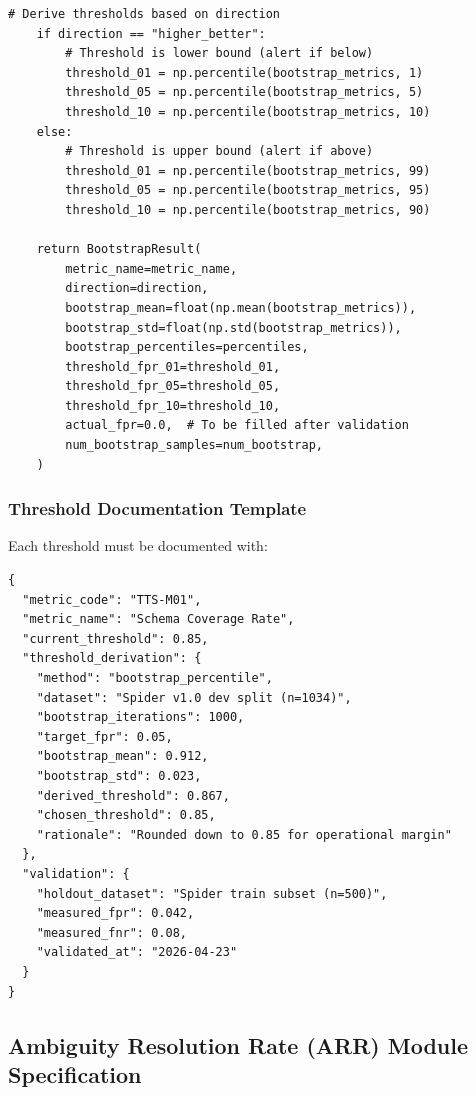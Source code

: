 \begin{lstlisting}[language=jsonx,caption={Threshold bootstrap implementation}]
    # Derive thresholds based on direction
    if direction == "higher_better":
        # Threshold is lower bound (alert if below)
        threshold_01 = np.percentile(bootstrap_metrics, 1)
        threshold_05 = np.percentile(bootstrap_metrics, 5)
        threshold_10 = np.percentile(bootstrap_metrics, 10)
    else:
        # Threshold is upper bound (alert if above)
        threshold_01 = np.percentile(bootstrap_metrics, 99)
        threshold_05 = np.percentile(bootstrap_metrics, 95)
        threshold_10 = np.percentile(bootstrap_metrics, 90)
    
    return BootstrapResult(
        metric_name=metric_name,
        direction=direction,
        bootstrap_mean=float(np.mean(bootstrap_metrics)),
        bootstrap_std=float(np.std(bootstrap_metrics)),
        bootstrap_percentiles=percentiles,
        threshold_fpr_01=threshold_01,
        threshold_fpr_05=threshold_05,
        threshold_fpr_10=threshold_10,
        actual_fpr=0.0,  # To be filled after validation
        num_bootstrap_samples=num_bootstrap,
    )
\end{lstlisting}

\subsubsection{Threshold Documentation Template}

Each threshold must be documented with:

\begin{lstlisting}[language=jsonx,caption={Threshold documentation schema}]
{
  "metric_code": "TTS-M01",
  "metric_name": "Schema Coverage Rate",
  "current_threshold": 0.85,
  "threshold_derivation": {
    "method": "bootstrap_percentile",
    "dataset": "Spider v1.0 dev split (n=1034)",
    "bootstrap_iterations": 1000,
    "target_fpr": 0.05,
    "bootstrap_mean": 0.912,
    "bootstrap_std": 0.023,
    "derived_threshold": 0.867,
    "chosen_threshold": 0.85,
    "rationale": "Rounded down to 0.85 for operational margin"
  },
  "validation": {
    "holdout_dataset": "Spider train subset (n=500)",
    "measured_fpr": 0.042,
    "measured_fnr": 0.08,
    "validated_at": "2026-04-23"
  }
}
\end{lstlisting}

\subsection{Ambiguity Resolution Rate (ARR) Module Specification}
\label{sec:arr-impl}

